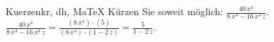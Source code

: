 \begin{MAufgabe}{Kuerzen}{kr, dh, MaTeX}
K\"urzen Sie soweit m\"oglich: $\frac{40\, x^4}{8\, x^4 - 16\, x^4\, z}$.\\ 
\ifLsg\MLoesung
\quad $\frac{40\, x^4}{8\, x^4 - 16\, x^4\, z}=\frac{(8\, x^4)\cdot(5)}{(8\, x^4)\cdot(1 - 2\, z)}=\frac{5}{1 - 2\, z}$.\else\relax\fi
 \end{MAufgabe}